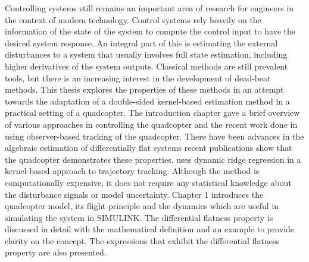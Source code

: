 \documentclass[letterpaper%
, twoside%
, 12pt%
,memoire%
, english%
,creativecommons,hyperref%
]{thETS}
\theoremstyle{newThmStyle}
\begin{document}
\begin{conclusion}
Controlling systems still remains an important area of research for engineers in the context of modern technology. Control systems rely heavily on the information of the state of the system to compute the control input to have the desired system response. An integral part of this is estimating the external disturbances to a system that usually involves full state estimation, including higher derivatives of the system outputs. Classical methods are still prevalent tools, but there is an increasing interest in the development of dead-beat methods. This thesis explores the properties of these methods in an attempt towards the adaptation of a double-sided kernel-based estimation method in a practical setting of a quadcopter. The introduction chapter gave a brief overview of various approaches in controlling the quadcopter and the recent work done in using observer-based tracking of the quadcopter. There have been advances in the algebraic estimation of differentially flat systems recent publications show that the quadcopter demonstrates these properties. \citep{RN118} uses dynamic ridge regression in a kernel-based approach to trajectory tracking. Although the method is computationally expensive, it does not require any statistical knowledge about the disturbance signals or model uncertainty. 
Chapter 1 introduces the quadcopter model, its flight principle and the dynamics which are useful in simulating the system in SIMULINK. The differential flatness property is discussed in detail with the mathematical definition and an example to provide clarity on the concept. The expressions that exhibit the differential flatness property are also presented.


\end{conclusion}
\end{document}
